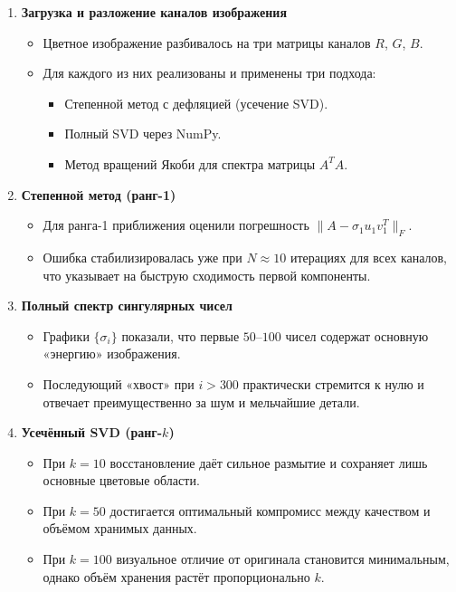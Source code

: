 \documentclass[a4paper,12pt]{article}
\begin{document}
\begin{enumerate}
    \item \textbf{Загрузка и разложение каналов изображения}
    \begin{itemize}
        \item Цветное изображение разбивалось на три матрицы каналов $R$, $G$, $B$.
        \item Для каждого из них реализованы и применены три подхода:
        \begin{itemize}
            \item Степенной метод с дефляцией (усечение SVD).
            \item Полный SVD через NumPy.
            \item Метод вращений Якоби для спектра матрицы $A^T A$.
        \end{itemize}
    \end{itemize}
    
    \item \textbf{Степенной метод (ранг-1)}
    \begin{itemize}
        \item Для ранга-1 приближения оценили погрешность $\|A - \sigma_1 u_1 v_1^T\|_F$.
        \item Ошибка стабилизировалась уже при $N \approx 10$ итерациях для всех каналов, что указывает на быструю сходимость первой компоненты.
    \end{itemize}
    
    \item \textbf{Полный спектр сингулярных чисел}
    \begin{itemize}
        \item Графики $\{\sigma_i\}$ показали, что первые $50$--$100$ чисел содержат основную «энергию» изображения.
        \item Последующий «хвост» при $i > 300$ практически стремится к нулю и отвечает преимущественно за шум и мельчайшие детали.
    \end{itemize}
    
    \item \textbf{Усечённый SVD (ранг-$k$)}
    \begin{itemize}
        \item При $k=10$ восстановление даёт сильное размытие и сохраняет лишь основные цветовые области.
        \item При $k=50$ достигается оптимальный компромисс между качеством и объёмом хранимых данных.
        \item При $k=100$ визуальное отличие от оригинала становится минимальным, однако объём хранения растёт пропорционально $k$.
    \end{itemize}
    

\end{enumerate}
\end{document}
